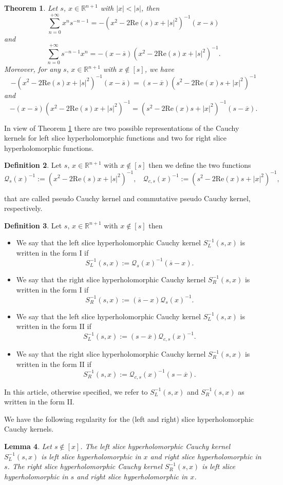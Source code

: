 \documentclass[reqno,11pt]{amsart}
\numberwithin{equation}{section}
\newcommand{\PRes}{\mathcal{Q}}
\newtheorem{theorem}{Theorem}[section]
\newtheorem{lemma}[theorem]{Lemma}
\theoremstyle{definition}
\newtheorem{definition}[theorem]{Definition}
\renewcommand{\Re}{\mathrm{Re}}
\begin{document}
\begin{theorem}\label{ts}
	Let $s$, $x\in \mathbb R^{n+1}$ with $|x|<|s|$, then
	$$\sum_{n=0}^{+\infty} x^ns^{-n-1}=-(x^2-2\Re(s)x+|s|^2)^{-1}(x-\overline s)$$
	and
	$$\sum_{n=0}^{+\infty} s^{-n-1}x^n=-(x-\overline s)(x^2-2\Re(s)x+|s|^2)^{-1}.$$
	Moreover, for any $s,\, x\in \mathbb R^{n+1}$ with $x\notin [s]$, we have
	$$ -(x^2-2\Re(s)x+|s|^2)^{-1}(x-\overline s)=(s-\overline x)(s^2-2\Re(x)s+|x|^2)^{-1} $$
	and
	$$ -(x-\overline s)(x^2-2\Re(s)x+|s|^2)^{-1}=(s^2-2\Re(x)s+|x|^2)^{-1}(s-\overline x).$$
\end{theorem}
In view of Theorem \ref{ts} there are two possible representations of the Cauchy kernels for left slice hyperholomorphic functions and two for right slice hyperholomorphic functions.
\begin{definition}
	Let $s,\, x\in \mathbb R^{n+1}$ with $x\notin [s]$ then we define the two functions
	$$ \PRes_{s}(x)^{-1}:=(x^2-2\Re(s)x+|s|^2)^{-1} ,\ \ \ \
	\PRes_{c,s}(x)^{-1}:=(s^2-2\Re(x)s+|x|^2)^{-1},
	$$
\end{definition}
that are called pseudo Cauchy kernel and commutative pseudo Cauchy kernel, respectively.
\begin{definition}\label{d1}
	Let $s,\, x\in \mathbb R^{n+1}$ with $x\notin [s]$ then
	\begin{itemize}
		\item We say that the left slice hyperholomorphic Cauchy kernel  $S^{-1}_L(s,x)$ is written in the form I if
		$$S^{-1}_L(s,x):=\PRes_{s}(x)^{-1}(\overline s-x).$$
		\item We say that the right slice hyperholomorphic Cauchy kernel  $S^{-1}_R(s,x)$ is written in the form I if
		$$S^{-1}_R(s,x):= (\overline s-x)\PRes_{s}(x)^{-1}.$$
		\item We say that the left slice hyperholomorphic Cauchy kernel  $S^{-1}_L(s,x)$ is written in the form II if
		$$S^{-1}_L(s,x):=(s-\overline x) \PRes_{c,s}(x)^{-1}.$$
		\item We say that the right slice hyperholomorphic Cauchy kernel  $S^{-1}_R(s,x)$ is written in the form II if
		$$S^{-1}_R(s,x):= \PRes_{c,s}(x)^{-1}(s- \overline x).$$
	\end{itemize}
\end{definition}
In this article, otherwise specified, we refer to $S^{-1}_L(s,x)$ and $S^{-1}_R(s,x)$ as written in the form II.

We have the following regularity for the (left and right) slice hyperholomorphic Cauchy kernels.
\begin{lemma} Let  $s\notin [x]$.
	The left slice hyperholomorphic Cauchy kernel $S_L^{-1}(s,x)$ is left slice hyperholomorphic in $x$ and right slice hyperholomorphic in $s$. The right slice hyperholomorphic Cauchy kernel $S_R^{-1}(s,x)$ is left slice hyperholomorphic in $s$ and right slice hyperholomorphic in $x$.
\end{lemma}
\end{document}
